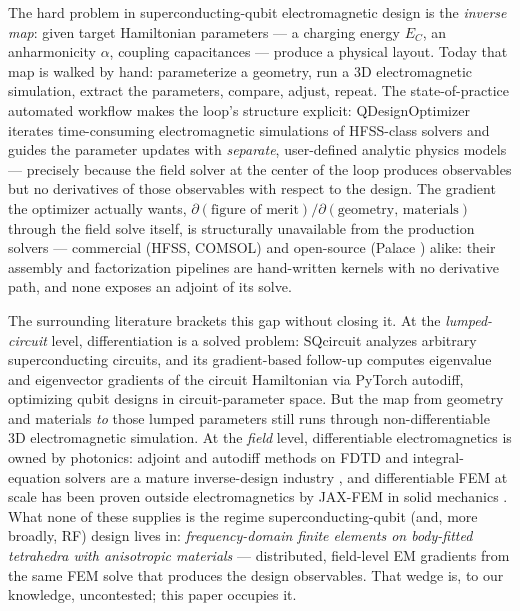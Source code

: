 \documentclass{anvil-paper}
\begin{document}
The hard problem in superconducting-qubit electromagnetic design is the
\emph{inverse map}: given target Hamiltonian parameters --- a charging
energy $E_C$, an anharmonicity $\alpha$, coupling capacitances --- produce
a physical layout. Today that map is walked by hand: parameterize a
geometry, run a 3D electromagnetic simulation, extract the parameters,
compare, adjust, repeat. The state-of-practice automated workflow makes
the loop's structure explicit: QDesignOptimizer
\citep{eriksson2025automated} iterates time-consuming electromagnetic
simulations of HFSS-class solvers and guides the parameter updates with
\emph{separate}, user-defined analytic physics models --- precisely
because the field solver at the center of the loop produces observables
but no derivatives of those observables with respect to the design. The
gradient the optimizer actually wants, $\partial(\text{figure of
merit})/\partial(\text{geometry, materials})$ through the field solve
itself, is structurally unavailable from the production solvers ---
commercial (HFSS, COMSOL) and open-source (Palace \citep{palace}) alike:
their assembly and factorization pipelines are hand-written kernels with
no derivative path, and none exposes an adjoint of its solve.

The surrounding literature brackets this gap without closing it. At the
\emph{lumped-circuit} level, differentiation is a solved problem:
SQcircuit \citep{rajabzadeh2023analysis} analyzes arbitrary
superconducting circuits, and its gradient-based follow-up
\citep{rajabzadeh2024general} computes eigenvalue and eigenvector
gradients of the circuit Hamiltonian via PyTorch autodiff, optimizing
qubit designs in circuit-parameter space. But the map from geometry and
materials \emph{to} those lumped parameters still runs through
non-differentiable 3D electromagnetic simulation. At the \emph{field}
level, differentiable electromagnetics is owned by photonics: adjoint and
autodiff methods on FDTD and integral-equation solvers are a mature
inverse-design industry \citep{molesky2018inverse,hughes2019forward,
hammond2022high,schubert2022inverse,mahlau2026fdtdx,ponomareva2025torchgdm},
and differentiable FEM at scale has been proven outside electromagnetics
by JAX-FEM in solid mechanics \citep{xue2023jax}. What none of these
supplies is the regime superconducting-qubit (and, more broadly, RF)
design lives in: \emph{frequency-domain finite elements on body-fitted
tetrahedra with anisotropic materials} --- distributed, field-level EM
gradients from the same FEM solve that produces the design observables.
That wedge is, to our knowledge, uncontested; this paper occupies it.
\end{document}
